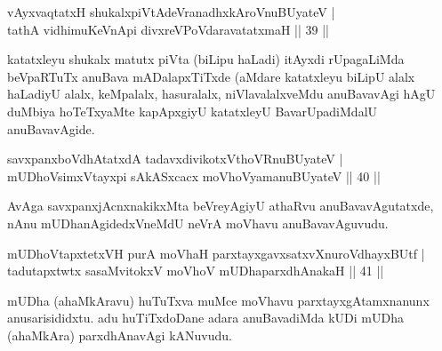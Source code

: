 
\begin{shl}
vAyxvaqtatxH shukalxpiVtAdeVranadhxkAroV\s nuBUyateV |\\
tathA vidhimuKeVnApi divxreVPoVdaravatatxmaH \hfill || 39 ||
\end{shl}

\begin{artha}
katatxleyu shukalx matutx piVta (biLipu haLadi) itAyxdi rUpagaLiMda beVpaRTuTx anuBava mADalapxTiTxde (aMdare katatxleyu biLipU alalx haLadiyU alalx, keMpalalx, hasuralalx, niVlavalalxveMdu anuBavavAgi hAgU duMbiya hoTeTxyaMte kapApxgiyU katatxleyU BavarUpadiMdalU anuBavavAgide.
\end{artha}

\begin{shl}
savxpanxboVdhAtatxdA tadavxdivikotxV\s thoVR\s nuBUyateV |\\
mUDhoV\s simxVtayxpi sAkASxcacx moVhoV\s yamanuBUyateV \hfill || 40 ||
\end{shl}

\begin{artha}
AvAga savxpanxjAcnxnakikxMta beVreyAgiyU athaRvu anuBavavAgutatxde, nAnu mUDhanAgidedxVneMdU neVrA moVhavu anuBavavAguvudu.
\end{artha}%


\begin{shl}
mUDhoVtapxtetxVH purA moVhaH parxtayxgavxsatxvXnuroVdhayxBUtf |\\
tadutapxtwtx sasaMvitokxV moVhoV mUDhaparxdhAnakaH \hfill || 41 ||
\end{shl}

\begin{artha}
mUDha (ahaMkAravu) huTuTxva muMce moVhavu parxtayxgAtamxnanunx anusarisididxtu. adu huTiTxdoDane adara anuBavadiMda kUDi mUDha (ahaMkAra) parxdhAnavAgi kANuvudu.
\end{artha}

